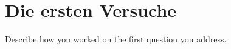\section{Die ersten Versuche} \label{versuch1}  %

Describe how you worked on the first question you address.

\blindtext
